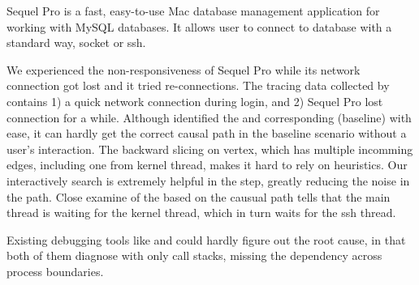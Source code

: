 Sequel Pro is a fast, easy-to-use Mac database management application for
working with MySQL databases. It allows user to connect to database with a
standard way, socket or ssh.

We experienced the non-responsiveness of Sequel Pro while its network connection
got lost and it tried re-connections. The tracing data collected by \xxx
contains 1) a quick network connection during login, and 2) Sequel Pro lost
connection for a while. Although \xxx identified the \spinningnode and
corresponding (baseline) \similarnode with ease, it can hardly get the correct
causal path in the baseline scenario without a user's interaction. The backward
slicing on vertex, which has multiple incomming edges, including one from
kernel thread, makes it hard to rely on heuristics. Our interactively search is
extremely helpful in the step, greatly reducing the noise in the path. Close
examine of the \spinningnode based on the causual path tells that the main
thread is waiting for the kernel thread, which in turn waits for the ssh thread.


Existing debugging tools like  and  could hardly figure
out the root cause, in that both of them diagnose with only call stacks, missing
the dependency across process boundaries.

